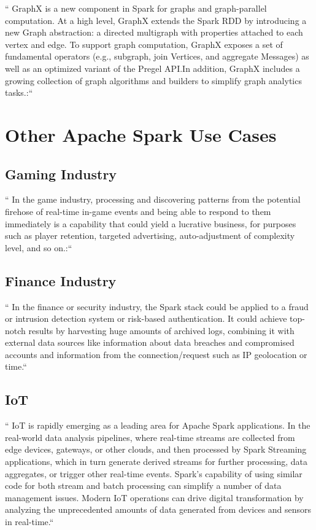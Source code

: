 `` GraphX is a new component in Spark for graphs and graph-parallel computation. At a high level,
GraphX extends the Spark RDD by introducing a new Graph abstraction: a directed multigraph with
properties attached to each vertex and edge. To support graph computation, GraphX exposes a set of
fundamental operators (e.g., subgraph, join Vertices, and aggregate Messages) as well as an optimized
variant of the Pregel API.In addition, GraphX includes a growing collection of graph algorithms and
builders to simplify graph analytics tasks.:``~\cite{hid-sp18-522-graphx}


\section{Other Apache Spark Use Cases}

\subsection{Gaming Industry}

`` In the game industry, processing and discovering patterns from the potential firehose of real-time in-game
events and being able to respond to them immediately is a capability that could yield a lucrative business,
for purposes such as player retention, targeted advertising, auto-adjustment of complexity level,
and so on.:``~\cite{hid-sp18-522-deepcore}

\subsection{Finance Industry}

`` In the finance or security industry, the Spark stack could be applied to a fraud or intrusion detection system
or risk-based authentication. It could achieve top-notch results by harvesting huge amounts of archived logs,
combining it with external data sources like information about data breaches and compromised accounts and
information from the connection/request such as IP geolocation or time.``~\cite{hid-sp18-522-deepcore}


\subsection{IoT}

`` IoT is rapidly emerging as a leading area for Apache Spark applications. In the real-world data analysis
pipelines, where real-time streams are collected from edge devices, gateways, or other clouds, and then
processed by Spark Streaming applications, which in turn generate derived streams for further processing,
data aggregates, or trigger other real-time events. Spark's capability of using similar code for both
stream and batch processing can simplify a number of data management issues. Modern IoT operations can
drive digital transformation by analyzing the unprecedented amounts of data generated from devices and
sensors in real-time.``~\cite{hid-sp18-522-IoT}


